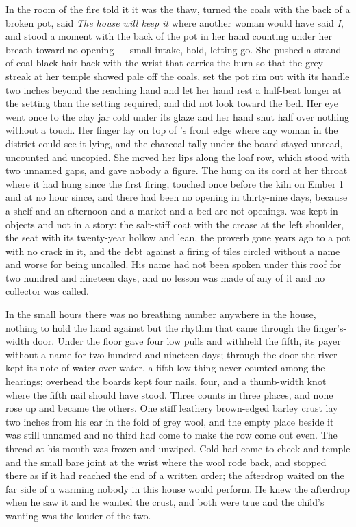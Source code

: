 In the room of the fire  told it it was the thaw, turned the coals with the back of a broken pot, said \emph{The house will keep it} where another woman would have said \emph{I}, and stood a moment with the back of the pot in her hand counting under her breath toward no opening --- small intake, hold, letting go. She pushed a strand of coal-black hair back with the wrist that carries the burn so that the grey streak at her temple showed pale off the coals, set the pot rim out with its handle two inches beyond the reaching hand and let her hand rest a half-beat longer at the setting than the setting required, and did not look toward the bed. Her eye went once to the clay jar cold under its glaze and her hand shut half over nothing without a touch. Her finger lay on top of 's front edge where any woman in the district could see it lying, and the charcoal tally under the board stayed unread, uncounted and uncopied. She moved her lips along the loaf row, which stood with two unnamed gaps, and gave nobody a figure. The  hung on its cord at her throat where it had hung since the first firing, touched once before the kiln on Ember 1 and at no hour since, and there had been no opening in thirty-nine days, because a shelf and an afternoon and a market and a bed are not openings.  was kept in objects and not in a story: the salt-stiff coat with the crease at the left shoulder, the seat with its twenty-year hollow and lean, the proverb gone years ago to a pot with no crack in it, and the debt against a firing of tiles circled without a name and worse for being uncalled. His name had not been spoken under this roof for two hundred and nineteen days, and no lesson was made of any of it and no collector was called.

In the small hours there was no breathing number anywhere in the house, nothing to hold the hand against but the rhythm that came through the finger's-width door. Under the floor  gave four low pulls and withheld the fifth, its payer without a name for two hundred and nineteen days; through the door the river kept its note of water over water, a fifth low thing never counted among the hearings; overhead the boards kept four nails, four, and a thumb-width knot where the fifth nail should have stood. Three counts in three places, and none rose up and became the others. One stiff leathery brown-edged barley crust lay two inches from his ear in the fold of grey wool, and the empty place beside it was still unnamed and no third had come to make the row come out even. The thread at his mouth was frozen and unwiped. Cold had come to cheek and temple and the small bare joint at the wrist where the wool rode back, and stopped there as if it had reached the end of a written order; the afterdrop waited on the far side of a warming nobody in this house would perform. He knew the afterdrop when he saw it and he wanted the crust, and both were true and the child's wanting was the louder of the two.

